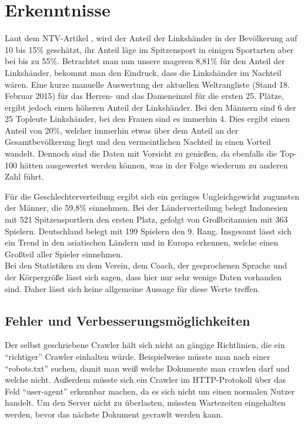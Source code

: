 \chapter{Erkenntnisse}
\label{Erkenntnisse}
Laut dem NTV-Artikel \cite{Hand2015}, wird der Anteil der Linkshänder in der Bevölkerung auf 10 bis 15\% geschätzt, ihr Anteil läge im Spitzensport in einigen Sportarten aber bei bis zu 55\%. Betrachtet man nun unsere mageren 8,81\% für den Anteil der Linkshänder, bekommt man den Eindruck, dass die Linkshänder im Nachteil wären. 
\newline \newline
Eine kurze manuelle Auswertung der aktuellen Weltrangliste (Stand 18. Februar 2015) für das Herren- und das Dameneinzel für die ersten 25. Plätze, ergibt jedoch einen höheren Anteil der Linkshänder. Bei den Männern sind 6 der 25 Topleute Linkshänder, bei den Frauen sind es immerhin 4. Dies ergibt einen Anteil von 20\%, welcher immerhin etwas über dem Anteil an der Gesamtbevölkerung liegt und den vermeintlichen Nachteil in einen Vorteil wandelt. Dennoch sind die Daten mit Vorsicht zu genießen, da ebenfalls die Top-100 hätten ausgewertet werden können, was in der Folge wiederum zu anderen Zahl führt. \newline

Für die Geschlechterverteilung ergibt sich ein geringes Ungleichgewicht zugunsten der Männer, die 59,8\% einnehmen. Bei der Länderverteilung belegt Indonesien mit 521 Spitzensportlern den ersten Platz, gefolgt von Großbritannien mit 363 Spielern. Deutschland belegt mit 199 Spielern den 9. Rang. Insgesamt lässt sich ein Trend in den asiatischen Ländern und in Europa erkennen, welche einen Großteil aller Spieler einnehmen.\\

Bei den Statistiken zu dem Verein, dem Coach, der gesprochenen Sprache und der Körpergröße lässt sich sagen, dass hier nur sehr wenige Daten vorhanden sind. Daher lässt sich keine allgemeine Aussage für diese Werte treffen.

\section{Fehler und Verbesserungsmöglichkeiten}
Der selbst geschriebene Crawler hält sich nicht an gängige Richtlinien, die ein "`richtiger"' Crawler einhalten würde. Beispielweise müsste man nach einer "`robots.txt"' suchen, damit man weiß welche Dokumente man crawlen darf und welche nicht. Außerdem müsste sich ein Crawler im HTTP-Protokoll über das Feld "`user-agent"' erkennbar machen, da es sich nicht um einen normalen Nutzer handelt. Um den Server nicht zu überlasten, müssten Wartezeiten eingehalten werden, bevor das nächste Dokument gecrawlt werden kann. 
\newpage

